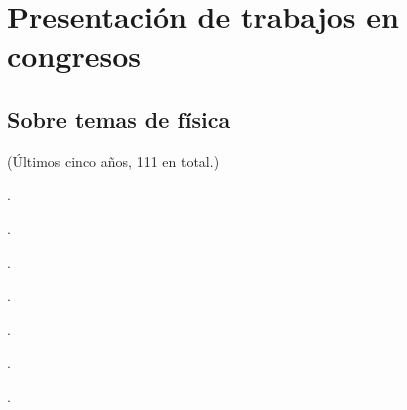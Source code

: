 \section{Presentación de trabajos en congresos}

\subsection{Sobre temas de física}
(Últimos cinco años, 111 en total.)

\begin{etaremune} 
    \item {} .
\item {}.
\item {}.
\item {}.
\item {}.
\item {}.
\item {}.
    

\end{etaremune}
